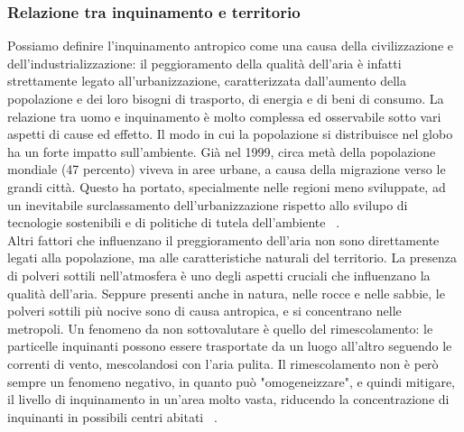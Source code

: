 \subsubsection{Relazione tra inquinamento e territorio}
Possiamo definire l'inquinamento antropico come una causa della civilizzazione e dell'industrializzazione: il peggioramento della qualità dell'aria è infatti strettamente legato all'urbanizzazione, caratterizzata dall'aumento della popolazione e dei loro bisogni di trasporto, di energia e di beni di consumo.
La relazione tra uomo e inquinamento è molto complessa ed osservabile sotto vari aspetti di cause ed effetto.
Il modo in cui la popolazione si distribuisce nel globo ha un forte impatto sull'ambiente.
Già nel 1999, circa metà della popolazione mondiale (47 percento) viveva in aree urbane, a causa della migrazione verso le grandi città.
Questo ha portato, specialmente nelle regioni meno sviluppate, ad un inevitabile surclassamento dell'urbanizzazione rispetto allo svilupo di tecnologie sostenibili e di politiche di tutela dell'ambiente ~\cite{population_and_enviroment}.
\\
Altri fattori che influenzano il preggioramento dell'aria non sono direttamente legati alla popolazione, ma alle caratteristiche naturali del territorio.
La presenza di polveri sottili nell'atmosfera è uno degli aspetti cruciali che influenzano la qualità dell'aria.
Seppure presenti anche in natura, nelle rocce e nelle sabbie, le polveri sottili più nocive sono di causa antropica, e si concentrano nelle metropoli.
Un fenomeno da non sottovalutare è quello del rimescolamento: le particelle inquinanti possono essere trasportate da un luogo all'altro seguendo le correnti di vento, mescolandosi con l'aria pulita.
Il rimescolamento non è però sempre un fenomeno negativo, in quanto può "omogeneizzare", e quindi mitigare, il livello di inquinamento in un'area molto vasta, riducendo la concentrazione di inquinanti in possibili centri abitati ~\cite{la_mincrometrologia}.


